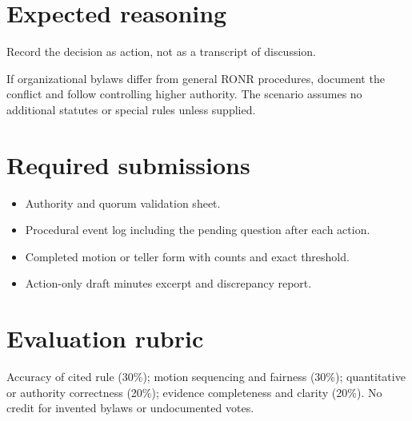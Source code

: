\documentclass[11pt]{article}
\begin{document}
\section{Expected reasoning}
Record the decision as action, not as a transcript of discussion.

If organizational bylaws differ from general RONR procedures, document the conflict and follow controlling higher authority. The scenario assumes no additional statutes or special rules unless supplied.

\section{Required submissions}
\begin{itemize}[leftmargin=*,itemsep=4pt]
\item Authority and quorum validation sheet.
\item Procedural event log including the pending question after each action.
\item Completed motion or teller form with counts and exact threshold.
\item Action-only draft minutes excerpt and discrepancy report.
\end{itemize}

\section{Evaluation rubric}
Accuracy of cited rule (30\%); motion sequencing and fairness (30\%); quantitative or authority correctness (20\%); evidence completeness and clarity (20\%). No credit for invented bylaws or undocumented votes.
\end{document}
